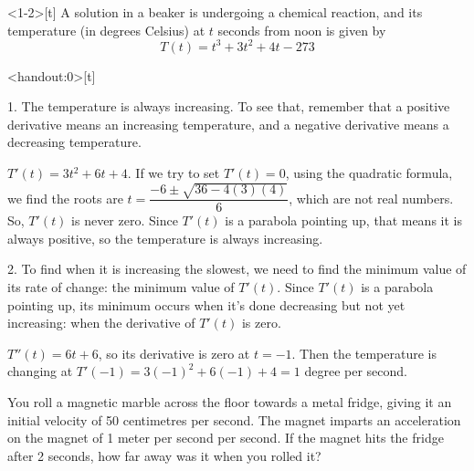 \begin{frame}<1-2>[t]
\AnswerYes
{}
A solution in a beaker is undergoing a chemical reaction, and its temperature (in degrees Celsius) at $t$ seconds from noon is given by
\[T(t) = t^3+3t^2+4t-273\]
\end{frame}
\begin{frame}<handout:0>[t]\color{answercolor}

1. The temperature is always increasing. To see that, remember that a positive derivative means an increasing temperature, and a negative derivative means a decreasing temperature.\vfill

$T'(t)=3t^2+6t+4$. If we try to set $T'(t)=0$, using the quadratic formula, we find the roots are $t=\dfrac{-6\pm\sqrt{36-4(3)(4)}}{6}$, which are not real numbers. So, $T'(t)$ is never zero. Since $T'(t)$ is a parabola pointing up, that means it is always positive, so the temperature is always increasing.\vfill

2. To find when it is increasing the slowest, we need to find the minimum value of its rate of change: the minimum value of $T'(t)$. Since $T'(t)$ is a parabola pointing up, its minimum occurs when it's done decreasing but not yet increasing: when the derivative of $T'(t)$ is zero.\vfill

$T''(t)=6t+6$, so its derivative is zero at $t=-1$. Then the temperature is changing at $T'(-1)=3(-1)^2+6(-1)+4=1$ degree per second.
\end{frame}
\begin{frame}[t]
\AnswerYes
You roll a magnetic marble across the floor towards a metal fridge, giving it an initial velocity of 50 centimetres per second. The magnet imparts an acceleration on the magnet of 1 meter per second per second. If the magnet hits the fridge after 2 seconds, how far away was it when you rolled it?



\end{frame}
